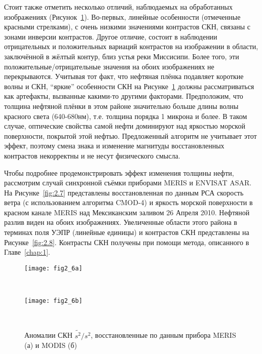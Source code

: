Стоит также отметить несколько отличий, наблюдаемых на обработанных изображениях (Рисунок~\ref{fig:2.6}). Во-первых, линейные особенности (отмеченные красными стрелками), с очень низкими значениями контрастов СКН, связаны с зонами инверсии контрастов. Другое отличие, состоит в наблюдении отрицательных и положительных вариаций контрастов на изображении в области, заключённой в жёлтый контур, близ устья реки Миссисипи. Более того, эти положительные/отрицательные значения на обоих изображениях не перекрываются. Учитывая тот факт, что нефтяная плёнка подавляет короткие волны и СКН, ``яркие'' особенности СКН на Рисунке~\ref{fig:2.6} должны рассматриваться как артефакты, вызванные какими-то другими факторами. Предположим, что толщина нефтяной плёнки в этом районе значительно больше длины волны красного света (640-680нм), т.е. толщина порядка 1 микрона и более. В таком случае, оптические свойства самой нефти доминируют над яркостью морской поверхности, покрытой этой нефтью. Предложенный алгоритм не учитывает этот эффект, поэтому смена знака и изменение магнитуды восстановленных контрастов некорректны и не несут физического смысла.

Чтобы подробнее продемонстрировать эффект изменения толщины нефти, рассмотрим случай синхронной съёмки приборами MERIS и ENVISAT ASAR. На Рисунке~\ref{fig:2.7} представлены восстановленная по данным РСА скорость ветра (с использованием алгоритма CMOD-4) и яркость морской поверхности в красном канале MERIS над Мексиканским заливом 26 Апреля 2010. Нефтяной разлив виден на обоих изображениях. Увеличенные области этого района в терминах поля УЭПР (линейные единицы) и контрастов СКН представлены на Рисунке~\ref{fig:2.8}. Контрасты СКН получены при помощи метода, описанного в Главе~\ref{chap:1}.



\begin{figure}[H]
   	\centering
	\begin{minipage}{.83\textwidth}
	    \subcaptionbox{\label{fig:2.6a}}
		{\texttt{[image: fig2\_6a]}}
	\end{minipage}
	\hfill
	\\
	\begin{minipage}{.83\textwidth}
	    \subcaptionbox{\label{fig:2.6b}}
		{\texttt{[image: fig2\_6b]}}
	\end{minipage}
    \\
    \caption{Аномалии СКН $\widetilde{s^{2} }/s^{2}$, восстановленные по данным прибора MERIS (а) и MODIS (б)}
    \label{fig:2.6}
\end{figure}


